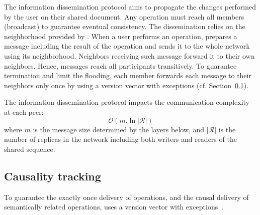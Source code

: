 \begin{asparadesc}
\item [The information dissemination protocol]\cite{birman1999bimodal} aims to
  propagate the changes performed by the user on their shared document. Any
  operation must reach all members (broadcast) to guarantee eventual
  consistency. The dissemination relies on the neighborhood provided by
  \SPRAY. When a user performs an operation, \CRATE prepares a message including
  the result of the operation and sends it to the whole network using its
  neighborhood. Neighbors receiving such message forward it to their own
  neighbors. Hence, messages reach all participants transitively. To guarantee
  termination and limit the flooding, each member forwards each message to their
  neigbhors only once by using a version vector with exceptions
  (cf. Section~\ref{subsec:causality}).

  The information dissemination protocol impacts the communication complexity at
  each peer:
  \begin{equation}
    \mathcal{O}(m.\ln |\mathcal{R}| )
  \end{equation}
  where $m$ is the message size determined by the layers below, and
  $|\mathcal{R}|$ is the number of replicas in the network including both
  writers and readers of the shared sequence.
\end{asparadesc}

\subsection{Causality tracking}
\label{subsec:causality}

To guarantee the exactly once delivery of operations, and the causal delivery of
semantically related operations, \CRATE uses a version vector with
exceptions~\cite{malkhi2007concise, mukund2014optimized}.

